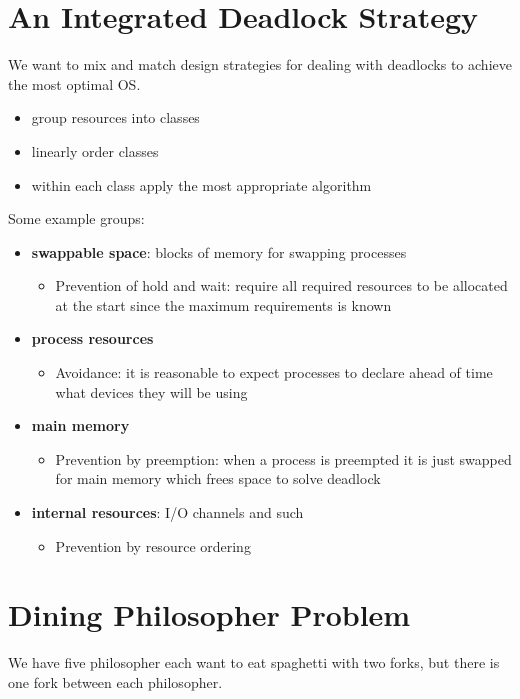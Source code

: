 \documentclass[12pt]{article}
\begin{document}
\section{An Integrated Deadlock Strategy}
We want to mix and match design strategies for dealing with deadlocks to achieve the most optimal OS.
\begin{itemize}
  \item group resources into classes
  \item linearly order classes
  \item within each class apply the most appropriate algorithm
\end{itemize}

Some example groups:
\begin{itemize}
  \item \textbf{swappable space}: blocks of memory for swapping processes
  \begin{itemize}
    \item Prevention of hold and wait: require all required resources to be allocated at the start since the maximum requirements is known
  \end{itemize}
  \item \textbf{process resources}
  \begin{itemize}
    \item Avoidance: it is reasonable to expect processes to declare ahead of time what devices they will be using
  \end{itemize}
  \item \textbf{main memory}
  \begin{itemize}
    \item Prevention by preemption: when a process is preempted it is just swapped for main memory which frees space to solve deadlock
  \end{itemize}
  \item \textbf{internal resources}: I/O channels and such
  \begin{itemize}
    \item Prevention by resource ordering
  \end{itemize}
\end{itemize}

\section{Dining Philosopher Problem}
We have five philosopher each want to eat spaghetti with two forks, but there is one fork between each philosopher.
\end{document}
